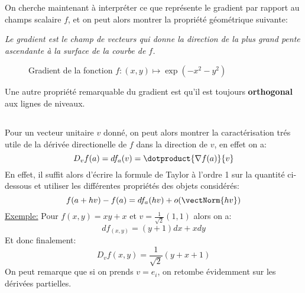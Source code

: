 On cherche maintenant à interpréter ce que représente le gradient par rapport au champs scalaire \(f\), et on peut alors montrer la propriété géométrique suivante:
\begin{center}
   \textit{Le gradient est le champ de vecteurs qui donne la direction de la plus grand pente ascendante à la surface de la courbe de \(f\).}
\end{center}
\begin{figure}[h]
   \centering
   \vspace*{-0.5mm}
   \captionsetup{labelformat=empty}
   \caption{Gradient de la fonction \(f : (x, y) \mapsto \exp(-x^2 - y^2)\)}
\end{figure}
Une autre propriété remarquable du gradient est qu'il est toujours \textbf{orthogonal} aux lignes de niveaux.

\subsection*{}
Pour un vecteur unitaire \(v\) donné, on peut alors montrer la caractérisation trés utile de la dérivée directionelle de \(f\) dans la direction de \(v\), en effet on a:
\[
   D_vf(a) = df_a(v) = \dotproduct{\nabla f(a)}{v}  
\]
En effet, il suffit alors d'écrire la formule de Taylor à l'ordre 1 sur la quantité ci-dessous et utiliser les différentes propriétés des objets considérés:
\[
   f(a + hv) - f(a) = df_a(hv) + o(\vectNorm{hv})
\]
\uline{Exemple:} Pour \(f(x,y) = xy + x\) et  \(v = \frac{1}{\sqrt{2}}(1, 1)\) alors on a:
\[
   df_{(x, y)} = (y+1)dx + xdy   
\]
Et donc finalement:
\[
   D_vf(x, y) = \frac{1}{\sqrt{2}}(y + x + 1)
\]
On peut remarque que si on prends \(v = e_i\), on retombe évidemment sur les dérivées partielles.
\pagebreak


